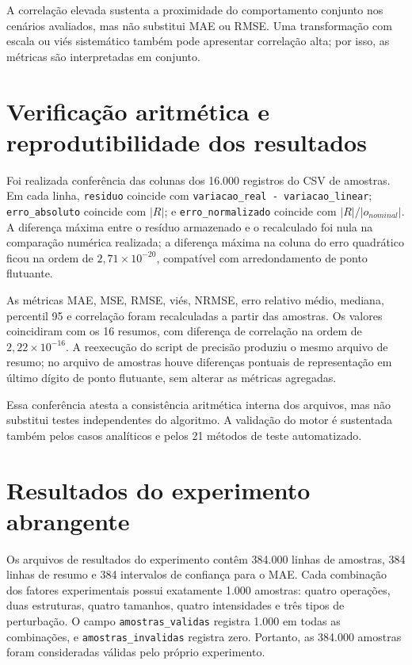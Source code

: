 \documentclass[12pt,openright,oneside,a4paper,brazil]{abntex2}
\begin{document}
A correlação elevada sustenta a proximidade do comportamento conjunto nos cenários avaliados, mas não substitui MAE ou RMSE. Uma transformação com escala ou viés sistemático também pode apresentar correlação alta; por isso, as métricas são interpretadas em conjunto.

\section{Verificação aritmética e reprodutibilidade dos resultados}
Foi realizada conferência das colunas dos 16.000 registros do CSV de amostras. Em cada linha, \texttt{residuo} coincide com \texttt{variacao\_real - variacao\_linear}; \texttt{erro\_absoluto} coincide com $|R|$; e \texttt{erro\_normalizado} coincide com $|R|/|o_{nominal}|$. A diferença máxima entre o resíduo armazenado e o recalculado foi nula na comparação numérica realizada; a diferença máxima na coluna do erro quadrático ficou na ordem de $2{,}71\times10^{-20}$, compatível com arredondamento de ponto flutuante.

As métricas MAE, MSE, RMSE, viés, NRMSE, erro relativo médio, mediana, percentil 95 e correlação foram recalculadas a partir das amostras. Os valores coincidiram com os 16 resumos, com diferença de correlação na ordem de $2{,}22\times10^{-16}$. A reexecução do script de precisão produziu o mesmo arquivo de resumo; no arquivo de amostras houve diferenças pontuais de representação em último dígito de ponto flutuante, sem alterar as métricas agregadas.

Essa conferência atesta a consistência aritmética interna dos arquivos, mas não substitui testes independentes do algoritmo. A validação do motor é sustentada também pelos casos analíticos e pelos 21 métodos de teste automatizado.

\section{Resultados do experimento abrangente}
Os arquivos de resultados do experimento contêm 384.000 linhas de amostras, 384 linhas de resumo e 384 intervalos de confiança para o MAE. Cada combinação dos fatores experimentais possui exatamente 1.000 amostras: quatro operações, duas estruturas, quatro tamanhos, quatro intensidades e três tipos de perturbação. O campo \texttt{amostras\_validas} registra 1.000 em todas as combinações, e \texttt{amostras\_invalidas} registra zero. Portanto, as 384.000 amostras foram consideradas válidas pelo próprio experimento.
\end{document}
